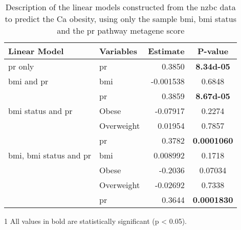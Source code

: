 	\begin{table}[htpb]
		\centering
		\caption[Description of the linear models constructed from the \gls{nzbc} data to predict the Ca obesity, using only the sample \gls{bmi}, \gls{bmi} status and the \acrshort{pr} pathway metagene score]{Description of the linear models constructed from the \gls{nzbc} data to predict the Ca obesity, using only the sample \gls{bmi}, \gls{bmi} status and the \gls{pr} pathway metagene score}
		\label{tab:lm_pr_only_ca}
		\begin{threeparttable}
			\begin{tabular}{llrc}
				Linear Model & Variables & Estimate & {P-value}\\
					\hline
					\hline
					\rule{0pt}{2.25ex}\gls{pr} only                            & \gls{pr}   & 0.3850    & \bfseries \num{8.34d-05} \tnote{1}\\
					\hline
					\rule{0pt}{2.25ex}\gls{bmi} and \gls{pr}                   & \gls{bmi}  & -0.001538 & 0.6848    \\
                                                                               & \gls{pr}   & 0.3859    & \bfseries \num{8.67d-05}  \\
					\hline
					\rule{0pt}{2.25ex}\gls{bmi} status and \gls{pr}            & Obese      & -0.07917  & 0.2274    \\
                                                                               & Overweight & 0.01954   & 0.7857    \\
                                                                               & \gls{pr}   & 0.3782    & \bfseries 0.0001060  \\
					\hline
					\rule{0pt}{2.25ex}\gls{bmi}, \gls{bmi} status and \gls{pr} & \gls{bmi}  & 0.008992  & 0.1718    \\
                                                                               & Obese      & -0.2036   & 0.07034   \\
                                                                               & Overweight & -0.02692  & 0.7338    \\
                                                                               & \gls{pr}   & 0.3644    & \bfseries 0.0001830  \\
					\hline
					\hline
			\end{tabular}
				\begin{tablenotes}
					\begin{footnotesize}
					\item [1] All values in bold are statistically significant (p \textless{} 0.05).
					\end{footnotesize}
				\end{tablenotes}
		\end{threeparttable}
	\end{table}

